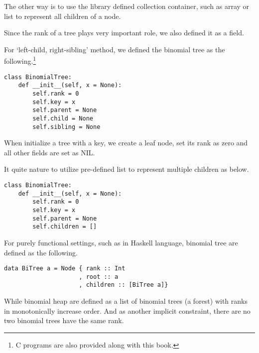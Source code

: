 \documentclass{article}
\begin{document}

The other way is to use the library defined collection container, such
as array or list to represent all children of a node.

Since the rank of a tree plays very important role, we also defined
it as a field.

For `left-child, right-sibling' method, we defined the binomial tree
as the following.\footnote{C programs are also provided along with this book.}

\lstset{language=Python}
\begin{lstlisting}
class BinomialTree:
    def __init__(self, x = None):
        self.rank = 0
        self.key = x
        self.parent = None
        self.child = None
        self.sibling = None
\end{lstlisting}

When initialize a tree with a key, we create a leaf node, set its rank
as zero and all other fields are set as NIL.

It quite nature to utilize pre-defined list to represent multiple children
as below.

\begin{lstlisting}
class BinomialTree:
    def __init__(self, x = None):
        self.rank = 0
        self.key = x
        self.parent = None
        self.children = []
\end{lstlisting}

For purely functional settings, such as in Haskell language, binomial tree
are defined as the following.

\lstset{language=Haskell}
\begin{lstlisting}
data BiTree a = Node { rank :: Int
                     , root :: a
                     , children :: [BiTree a]} 
\end{lstlisting}

While binomial heap are defined as a list of binomial trees (a forest) with 
ranks in monotonically increase order. And as another implicit constraint,
there are no two binomial trees have the same rank.
\end{document}
